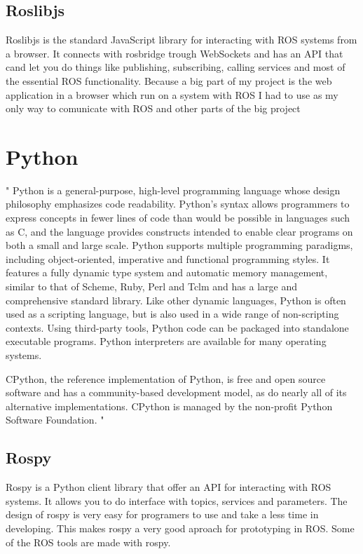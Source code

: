 \subsection{Roslibjs}
\label{sub-sec:javascript-roslib}
Roslibjs is the standard JavaScript library for interacting with ROS systems from
a browser. It connects with rosbridge trough WebSockets and has an API that cand let
you do things like publishing, subscribing, calling services and most of the essential ROS
functionality. Because a big part of my project is the web application in a browser which 
run on a system with ROS I had to use as my only way to comunicate with ROS and other parts
of the big project

\section{Python}
\label{sec:python}
"
Python is a general-purpose, high-level programming language whose design philosophy emphasizes code readability.
Python's syntax allows programmers to express concepts in fewer lines of code than would be possible in languages
such as C, and the language provides constructs intended to enable clear programs on both a small and large
scale.
Python supports multiple programming paradigms, including object-oriented, imperative and functional programming
styles. It features a fully dynamic type system and automatic memory management, similar to that of Scheme, Ruby,
Perl and Tclm and has a large and comprehensive standard library.
Like other dynamic languages, Python is often used as a scripting language, but is also used in a wide range of
non-scripting contexts. Using third-party tools, Python code can be packaged into standalone executable programs.
Python interpreters are available for many operating systems.

CPython, the reference implementation of Python, is free and open source software and has a community-based
development model, as do nearly all of its alternative implementations. CPython is managed by the non-profit Python
Software Foundation.
" \cite{van2007python}
\subsection{Rospy}
\label{sub-sec:python-rospy}
Rospy is a Python client library that offer an API for interacting with ROS systems.
It allows you to do interface with topics, services and parameters. The design of rospy
is very easy for programers to use and take a less time in developing. This makes rospy
a very good aproach for prototyping in ROS. Some of the ROS tools are made with rospy.


